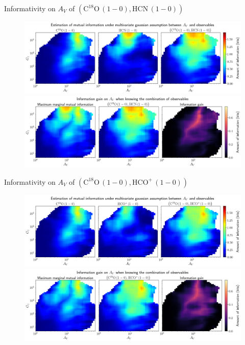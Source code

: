 \documentclass{beamer}
\begin{document}
\begin{frame}{Informativity on $A_V$ of $\left(\mathrm{C^{18}O\,(1-0)},\mathrm{HCN\,(1-0)}\right)$}
    \begin{figure}
        \centering
        \includegraphics[width=0.95\linewidth]{../linearinfo/av__c18o10_hcn10_linearinfo.png}
        \vfill
        \includegraphics[width=0.95\linewidth]{../linearinfo/av__c18o10_hcn10_linearinfo_gain.png}
    \end{figure}
\end{frame}

\begin{frame}{Informativity on $A_V$ of $\left(\mathrm{C^{18}O\,(1-0)},\mathrm{HCO^+\,(1-0)}\right)$}
    \begin{figure}
        \centering
        \includegraphics[width=0.95\linewidth]{../linearinfo/av__c18o10_hcop10_linearinfo.png}
        \vfill
        \includegraphics[width=0.95\linewidth]{../linearinfo/av__c18o10_hcop10_linearinfo_gain.png}
    \end{figure}
\end{frame}
\end{document}
